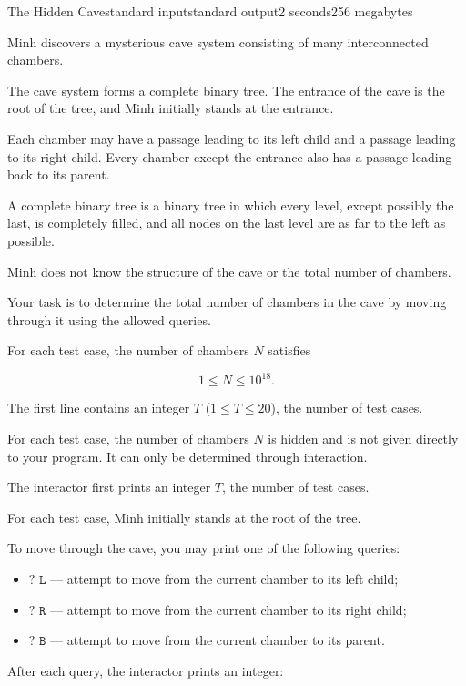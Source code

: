 \begin{problem}{The Hidden Cave}{standard input}{standard output}{2 seconds}{256 megabytes}

Minh discovers a mysterious cave system consisting of many interconnected chambers.

The cave system forms a complete binary tree. The entrance of the cave is the root of the tree, and Minh initially stands at the entrance.

Each chamber may have a passage leading to its left child and a passage leading to its right child. Every chamber except the entrance also has a passage leading back to its parent.

A complete binary tree is a binary tree in which every level, except possibly the last, is completely filled, and all nodes on the last level are as far to the left as possible.

Minh does not know the structure of the cave or the total number of chambers.

Your task is to determine the total number of chambers in the cave by moving through it using the allowed queries.

For each test case, the number of chambers $N$ satisfies

$$1 \le N \le 10^{18}.$$

\InputFile
The first line contains an integer $T$ ($1 \le T \le 20$), the number of test cases.

For each test case, the number of chambers $N$ is hidden and is not given directly to your program. It can only be determined through interaction.

\Interaction
The interactor first prints an integer $T$, the number of test cases.

For each test case, Minh initially stands at the root of the tree.

To move through the cave, you may print one of the following queries:

\begin{itemize}
\item $\texttt{? L}$ --- attempt to move from the current chamber to its left child;
\item $\texttt{? R}$ --- attempt to move from the current chamber to its right child;
\item $\texttt{? B}$ --- attempt to move from the current chamber to its parent.
\end{itemize}

After each query, the interactor prints an integer:


\end{problem}
